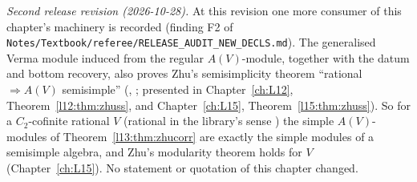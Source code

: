 \emph{Second release revision (2026-10-28).} At this revision one more consumer of this chapter's machinery is
recorded (finding F2 of \texttt{Notes/\allowbreak Textbook/\allowbreak referee/\allowbreak RELEASE\_AUDIT\_NEW\_DECLS.md}). The
generalised Verma module induced from the regular $A(V)$-module, together with the datum  and bottom recovery, also
proves Zhu's semisimplicity theorem ``rational $\Rightarrow A(V)$ semisimple''
(\allowbreak{}\allowbreak{}, ; presented in Chapter~\ref{ch:L12}, Theorem~\ref{l12:thm:zhuss}, and Chapter~\ref{ch:L15},
Theorem~\ref{l15:thm:zhuss}). So for a $C_2$-cofinite rational $V$ (rational in the library's sense )
the simple $A(V)$-modules of Theorem~\ref{l13:thm:zhucorr} are exactly the simple modules of a semisimple algebra, and Zhu's
modularity theorem holds for $V$ (Chapter~\ref{ch:L15}). No statement or quotation of this chapter changed.

